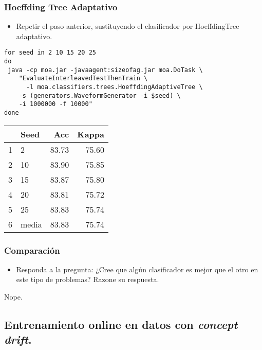 \documentclass[11pt]{article}
\begin{document}
\subsubsection{Hoeffding Tree Adaptativo}
\label{sec:orgce49934}
\begin{itemize}
\item Repetir el paso anterior, sustituyendo el clasificador por
HoeffdingTree adaptativo.
\end{itemize}


\begin{verbatim}
for seed in 2 10 15 20 25 
do 
 java -cp moa.jar -javaagent:sizeofag.jar moa.DoTask \
    "EvaluateInterleavedTestThenTrain \
      -l moa.classifiers.trees.HoeffdingAdaptiveTree \
	-s (generators.WaveformGenerator -i $seed) \
	-i 1000000 -f 10000"
done
\end{verbatim}

\begin{table}[ht]
\centering
\begin{tabular}{rlrr}
  \hline
 & Seed & Acc & Kappa \\ 
  \hline
1 & 2 & 83.73 & 75.60 \\ 
  2 & 10 & 83.90 & 75.85 \\ 
  3 & 15 & 83.87 & 75.80 \\ 
  4 & 20 & 83.81 & 75.72 \\ 
  5 & 25 & 83.83 & 75.74 \\ 
  6 & media & 83.83 & 75.74 \\ 
   \hline
\end{tabular}
\end{table}

\subsubsection{Comparación}
\label{sec:orga197d12}
\begin{itemize}
\item Responda a la pregunta: ¿Cree que algún clasificador es mejor que el
otro en este tipo de problemas? Razone su respuesta.
\end{itemize}

Nope.

\subsection{Entrenamiento online en datos con \emph{concept drift}.}
\label{sec:org854545b}
\end{document}
